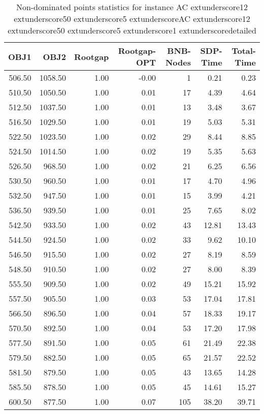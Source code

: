 \begin{table}
\caption{Non-dominated points statistics for instance AC	extunderscore12	extunderscore50	extunderscore5	extunderscoreAC	extunderscore12	extunderscore50	extunderscore5	extunderscore1	extunderscoredetailed}
\label{tab:stats/AC_12_50_5_AC_12_50_5_1_detailed}
\begin{tabular}{rrrrrrr}
\toprule
OBJ1 & OBJ2 & Rootgap & Rootgap-OPT & BNB-Nodes & SDP-Time & Total-Time \\
\midrule
506.50 & 1058.50 & 1.00 & -0.00 & 1 & 0.21 & 0.23 \\
510.50 & 1050.50 & 1.00 & 0.01 & 17 & 4.39 & 4.64 \\
512.50 & 1037.50 & 1.00 & 0.01 & 13 & 3.48 & 3.67 \\
516.50 & 1029.50 & 1.00 & 0.01 & 19 & 5.03 & 5.31 \\
522.50 & 1023.50 & 1.00 & 0.02 & 29 & 8.44 & 8.85 \\
524.50 & 1014.50 & 1.00 & 0.02 & 19 & 5.35 & 5.63 \\
526.50 & 968.50 & 1.00 & 0.02 & 21 & 6.25 & 6.56 \\
530.50 & 960.50 & 1.00 & 0.01 & 17 & 4.70 & 4.96 \\
532.50 & 947.50 & 1.00 & 0.01 & 15 & 3.99 & 4.21 \\
536.50 & 939.50 & 1.00 & 0.01 & 25 & 7.65 & 8.02 \\
542.50 & 933.50 & 1.00 & 0.02 & 43 & 12.81 & 13.43 \\
544.50 & 924.50 & 1.00 & 0.02 & 33 & 9.62 & 10.10 \\
546.50 & 915.50 & 1.00 & 0.02 & 27 & 8.19 & 8.59 \\
548.50 & 910.50 & 1.00 & 0.02 & 27 & 8.00 & 8.39 \\
555.50 & 909.50 & 1.00 & 0.02 & 49 & 15.21 & 15.92 \\
557.50 & 905.50 & 1.00 & 0.03 & 53 & 17.04 & 17.81 \\
566.50 & 896.50 & 1.00 & 0.04 & 57 & 18.33 & 19.17 \\
570.50 & 892.50 & 1.00 & 0.04 & 53 & 17.20 & 17.98 \\
577.50 & 891.50 & 1.00 & 0.05 & 61 & 21.49 & 22.38 \\
579.50 & 882.50 & 1.00 & 0.05 & 65 & 21.57 & 22.52 \\
581.50 & 879.50 & 1.00 & 0.05 & 43 & 13.65 & 14.28 \\
585.50 & 878.50 & 1.00 & 0.05 & 45 & 14.61 & 15.27 \\
600.50 & 877.50 & 1.00 & 0.07 & 105 & 38.20 & 39.71 \\

\end{tabular}
\end{table}
